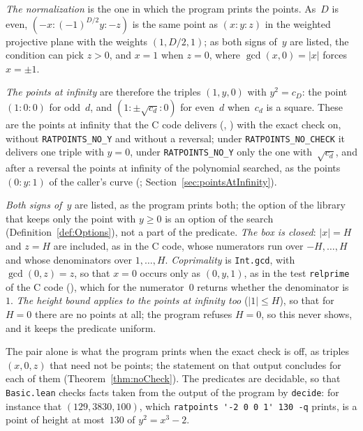 \begin{remark}\label{rem:pointsC}
  \emph{The normalization} is the one in which the program prints the points. As~$D$ is even,
  $(-x : (-1)^{D/2} y : -z)$ is the same point as $(x : y : z)$ in the weighted projective plane
  with the weights $(1, D/2, 1)$; as both signs of~$y$ are listed, the condition can pick $z > 0$,
  and $x = 1$ when $z = 0$, where $\gcd(x, 0) = |x|$ forces $x = \pm 1$.

  \emph{The points at infinity} are therefore the triples $(1, y, 0)$ with $y^2 = c_D$: the point
  $(1 : 0 : 0)$ for odd~$d$, and $(1 : \pm\sqrt{c_d} : 0)$ for even~$d$ when~$c_d$ is a square.
  These are the points at infinity that the C code delivers (,
  ) with the exact check on, without \verb|RATPOINTS_NO_Y| and
  without a reversal; under \verb|RATPOINTS_NO_CHECK| it delivers one triple with $y = 0$, under
  \verb|RATPOINTS_NO_Y| only the one with~$\sqrt{c_d}$, and after a reversal the points at infinity
  of the polynomial searched, as the points $(0 : y : 1)$ of the caller's curve
  (; Section~\ref{sec:pointsAtInfinity}).

  \emph{Both signs of~$y$} are listed, as the program prints both; the option of the library that
  keeps only the point with $y \ge 0$ is an option of the search (Definition~\ref{def:Options}), not
  a part of the predicate. \emph{The box is closed}: $|x| = H$ and $z = H$ are included, as in the C
  code, whose numerators run over $-H, \dots, H$ and whose denominators over $1, \dots, H$.
  \emph{Coprimality} is \verb|Int.gcd|, with $\gcd(0, z) = z$, so that $x = 0$ occurs only as
  $(0, y, 1)$, as in the test \verb|relprime| of the C code (), which for
  the numerator~$0$ returns whether the denominator is~$1$. \emph{The height bound applies to the
  points at infinity too} ($|1| \le H$), so that for $H = 0$ there are no points at all; the program
  refuses $H = 0$, so this never shows, and it keeps the predicate uniform.
\end{remark}

The pair alone is what the program prints when the exact check is off, as triples $(x, 0, z)$ that
need not be points; the statement on that output concludes  for
each of them (Theorem~\ref{thm:noCheck}). The predicates are decidable, so that \verb|Basic.lean|
checks facts taken from the output of the program by \verb|decide|: for instance that
$(129, 3830, 100)$, which \verb|ratpoints '-2 0 0 1' 130 -q| prints, is a point of height at
most~$130$ of $y^2 = x^3 - 2$.

